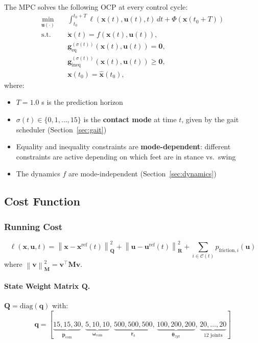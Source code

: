 \documentclass[11pt,a4paper]{article}
\newcommand{\wnorm}[2]{\left\| #1 \right\|_{#2}^2}
\begin{document}
The MPC solves the following OCP at every control cycle:
\begin{equation}
	\boxed{
		\begin{aligned}
			\min_{\bm{u}(\cdot)} \quad & \int_{t_0}^{t_0+T} \ell(\bm{x}(t), \bm{u}(t), t)\, dt + \Phi(\bm{x}(t_0+T)) \\
			\text{s.t.} \quad
			                           & \dot{\bm{x}}(t) = f(\bm{x}(t), \bm{u}(t)),                                  \\
			                           & \bm{g}_{\text{eq}}^{(\sigma(t))}(\bm{x}(t), \bm{u}(t)) = \bm{0},            \\
			                           & \bm{g}_{\text{ineq}}^{(\sigma(t))}(\bm{x}(t), \bm{u}(t)) \geq \bm{0},       \\
			                           & \bm{x}(t_0) = \hat{\bm{x}}(t_0),
		\end{aligned}
	}
\end{equation}
where:
\begin{itemize}
	\item $T = 1.0$ s is the prediction horizon
	\item $\sigma(t) \in \{0, 1, \ldots, 15\}$ is the \textbf{contact mode} at time $t$, given by the gait scheduler (Section~\ref{sec:gait})
	\item Equality and inequality constraints are \textbf{mode-dependent}: different constraints are active depending on which feet are in stance vs.\ swing
	\item The dynamics $f$ are mode-independent (Section~\ref{sec:dynamics})
\end{itemize}

\subsection{Cost Function}
\label{sec:cost}

\subsubsection{Running Cost}

\begin{equation}
	\ell(\bm{x}, \bm{u}, t) = \wnorm{\bm{x} - \bm{x}^{\text{ref}}(t)}{\bm{Q}}
	+ \wnorm{\bm{u} - \bm{u}^{\text{ref}}(t)}{\bm{R}}
	+ \sum_{i \in \mathcal{C}(t)} p_{\text{friction},i}(\bm{u})
\end{equation}
where $\wnorm{\bm{v}}{\bm{M}} = \bm{v}^\top \bm{M} \bm{v}$.

\paragraph{State Weight Matrix $\bm{Q}$.}
$\bm{Q} = \text{diag}(\bm{q})$ with:
\begin{equation}
	\bm{q} = [\underbrace{15, 15, 30}_{\dot{\bm{p}}_{\text{com}}},\,
	\underbrace{5, 10, 10}_{\bm{\omega}_{\text{com}}},\,
	\underbrace{500, 500, 500}_{\bm{r}_b},\,
	\underbrace{100, 200, 200}_{\bm{\theta}_{zyx}},\,
	\underbrace{20, \ldots, 20}_{12 \text{ joints}}]
\end{equation}
\end{document}
